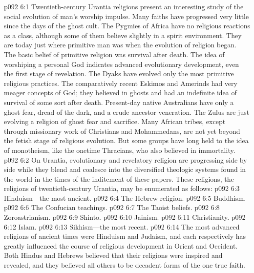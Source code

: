 \vs p092 6:1 Twentieth\hyp{}century Urantia religions present an interesting study of the social evolution of man’s worship impulse. Many faiths have progressed very little since the days of the ghost cult. The Pygmies of Africa have no religious reactions as a class, although some of them believe slightly in a spirit environment. They are today just where primitive man was when the evolution of religion began. The basic belief of primitive religion was survival after death. The idea of worshiping a personal God indicates advanced evolutionary development, even the first stage of revelation. The Dyaks have evolved only the most primitive religious practices. The comparatively recent Eskimos and Amerinds had very meager concepts of God; they believed in ghosts and had an indefinite idea of survival of some sort after death. Present\hyp{}day native Australians have only a ghost fear, dread of the dark, and a crude ancestor veneration. The Zulus are just evolving a religion of ghost fear and sacrifice. Many African tribes, except through missionary work of Christians and Mohammedans, are not yet beyond the fetish stage of religious evolution. But some groups have long held to the idea of monotheism, like the onetime Thracians, who also believed in immortality.
\pc \vs p092 6:2 On Urantia, evolutionary and revelatory religion are progressing side by side while they blend and coalesce into the diversified theologic systems found in the world in the times of the inditement of these papers. These religions, the religions of twentieth\hyp{}century Urantia, may be enumerated as follows:
\pc \vs p092 6:3 \bibnobreakspace Hinduism---the most ancient.
\vs p092 6:4 \bibnobreakspace The Hebrew religion.
\vs p092 6:5 \bibnobreakspace Buddhism.
\vs p092 6:6 \bibnobreakspace The Confucian teachings.
\vs p092 6:7 \bibnobreakspace The Taoist beliefs.
\vs p092 6:8 \bibnobreakspace Zoroastrianism.
\vs p092 6:9 \bibnobreakspace Shinto.
\vs p092 6:10 \bibnobreakspace Jainism.
\vs p092 6:11 \bibnobreakspace Christianity.
\vs p092 6:12 \bibnobreakspace Islam.
\vs p092 6:13 \bibnobreakspace Sikhism---the most recent.
\pc \vs p092 6:14 The most advanced religions of ancient times were Hinduism and Judaism, and each respectively has greatly influenced the course of religious development in Orient and Occident. Both Hindus and Hebrews believed that their religions were inspired and revealed, and they believed all others to be decadent forms of the one true faith.
